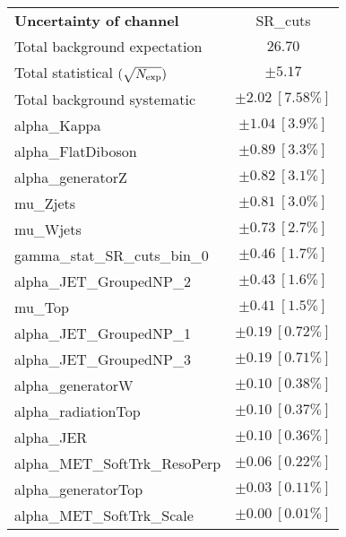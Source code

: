 
\begin{table}
\begin{center}
\setlength{\tabcolsep}{0.0pc}
\begin{tabular*}{\textwidth}{@{\extracolsep{\fill}}lc}
\noalign{\smallskip}\hline\noalign{\smallskip}
{\bf Uncertainty of channel}                                    & SR\_cuts            \\
\noalign{\smallskip}\hline\noalign{\smallskip}
Total background expectation             &  $26.70$       \\
\noalign{\smallskip}\hline\noalign{\smallskip}
Total statistical $(\sqrt{N_{\rm exp}})$              & $\pm 5.17$       \\
Total background systematic               & $\pm 2.02\ [7.58\%] $             \\
\noalign{\smallskip}\hline\noalign{\smallskip}
\noalign{\smallskip}\hline\noalign{\smallskip}
alpha\_Kappa         & $\pm 1.04\ [3.9\%] $       \\
alpha\_FlatDiboson         & $\pm 0.89\ [3.3\%] $       \\
alpha\_generatorZ         & $\pm 0.82\ [3.1\%] $       \\
mu\_Zjets         & $\pm 0.81\ [3.0\%] $       \\
mu\_Wjets         & $\pm 0.73\ [2.7\%] $       \\
gamma\_stat\_SR\_cuts\_bin\_0         & $\pm 0.46\ [1.7\%] $       \\
alpha\_JET\_GroupedNP\_2         & $\pm 0.43\ [1.6\%] $       \\
mu\_Top         & $\pm 0.41\ [1.5\%] $       \\
alpha\_JET\_GroupedNP\_1         & $\pm 0.19\ [0.72\%] $       \\
alpha\_JET\_GroupedNP\_3         & $\pm 0.19\ [0.71\%] $       \\
alpha\_generatorW         & $\pm 0.10\ [0.38\%] $       \\
alpha\_radiationTop         & $\pm 0.10\ [0.37\%] $       \\
alpha\_JER         & $\pm 0.10\ [0.36\%] $       \\
alpha\_MET\_SoftTrk\_ResoPerp         & $\pm 0.06\ [0.22\%] $       \\
alpha\_generatorTop         & $\pm 0.03\ [0.11\%] $       \\
alpha\_MET\_SoftTrk\_Scale         & $\pm 0.00\ [0.01\%] $       \\

\end{tabular*}
\end{center}
\end{table}
